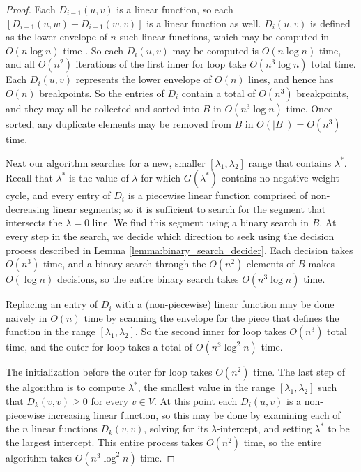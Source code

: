 \documentclass{llncs}
\begin{document}
\begin{proof}
Each $D_{i-1}(u,v)$ is a linear function, so each $[D_{i-1}(u,w)+D_{i-1}(w,v)]$ is a linear function as well.  $D_i(u,v)$ is defined as the lower envelope of $n$ such linear functions, which may be computed in $O(n \log n)$ time \cite{textbook}.  So each $D_i(u,v)$ may be computed is $O(n \log n)$ time, and all $O(n^2)$ iterations of the first inner for loop take $O(n^3 \log n)$ total time.  Each $D_i(u,v)$ represents the lower envelope of $O(n)$ lines, and hence has $O(n)$ breakpoints.  So the entries of $D_i$ contain a total of $O(n^3)$ breakpoints, and they may all be collected and sorted into $B$ in $O(n^3 \log n)$ time.  Once sorted, any duplicate elements may be removed from $B$ in $O(|B|)=O(n^3)$ time.

Next our algorithm searches for a new, smaller $[\lambda_1,\lambda_2]$ range that contains $\lambda^*$.  Recall that $\lambda^*$ is the value of $\lambda$ for which $G(\lambda^*)$ contains no negative weight cycle, and every entry of $D_i$ is a piecewise linear function comprised of non-decreasing linear segments; so it is sufficient to search for the segment that intersects the $\lambda=0$ line.  We find this segment using a binary search in $B$.  At every step in the search, we decide which direction to seek using the decision process described in Lemma \ref{lemma:binary_search_decider}.  Each decision takes $O(n^3)$ time, and a binary search through the $O(n^2)$ elements of $B$ makes $O(\log n)$ decisions, so the entire binary search takes $O(n^3 \log n)$ time.

Replacing an entry of $D_i$ with a (non-piecewise) linear function may be done naively in $O(n)$ time by scanning the envelope for the piece that defines the function in the range $[\lambda_1, \lambda_2]$.  So the second inner for loop takes $O(n^3)$ total time, and the outer for loop takes a total of $O(n^3 \log^2 n)$ time.

The initialization before the outer for loop takes $O(n^2)$ time.  The last step of the algorithm is to compute $\lambda^*$, the smallest value in the range $[\lambda_1, \lambda_2]$ such that $D_k(v,v) \geq 0$ for every $v \in V$.  At this point each $D_i(u,v)$ is a non-piecewise increasing linear function, so this may be done by examining each of the $n$ linear functions $D_k(v,v)$, solving for its $\lambda$-intercept, and setting $\lambda^*$ to be the largest intercept.  This entire process takes $O(n^2)$ time, so the entire algorithm takes $O(n^3 \log^2 n)$ time.
\end{proof}
\end{document}
